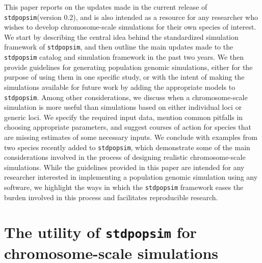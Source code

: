 \documentclass[hidelinks]{article}
\newcommand{\stdpopsim}{\texttt{stdpopsim}\xspace}
\begin{document}
This paper reports on the updates made in the current release of \stdpopsim  (version 0.2),
and is also intended as a resource for any researcher
who wishes to develop chromosome-scale simulations for their own species of interest.
We start by describing the central idea behind the standardized simulation framework
of \stdpopsim,
and then outline the main updates made to the \stdpopsim catalog and simulation framework
in the past two years.
We then provide guidelines for
generating population genomic simulations, either for the purpose of using them in one specific study,
or with the intent of making the simulations available for future work by adding the appropriate models to \stdpopsim.
Among other considerations, we discuss when a chromosome-scale simulation is more useful than
simulations based on either individual loci or generic %
loci.
We specify the required input data,
mention common pitfalls in choosing appropriate parameters,
and suggest courses of action for species that are missing estimates of some necessary inputs.
We conclude with examples from two species recently added to \stdpopsim,
which demonstrate some of the main considerations involved in the process of designing realistic chromosome-scale simulations.
While the guidelines provided in this paper are intended for any researcher interested in implementing a population genomic simulation using any software,
we highlight the ways in which the \stdpopsim framework eases the burden involved in this process and facilitates reproducible research.




\section*{The utility of \stdpopsim for chromosome-scale simulations}
    \label{sec:std-sim}
\end{document}
